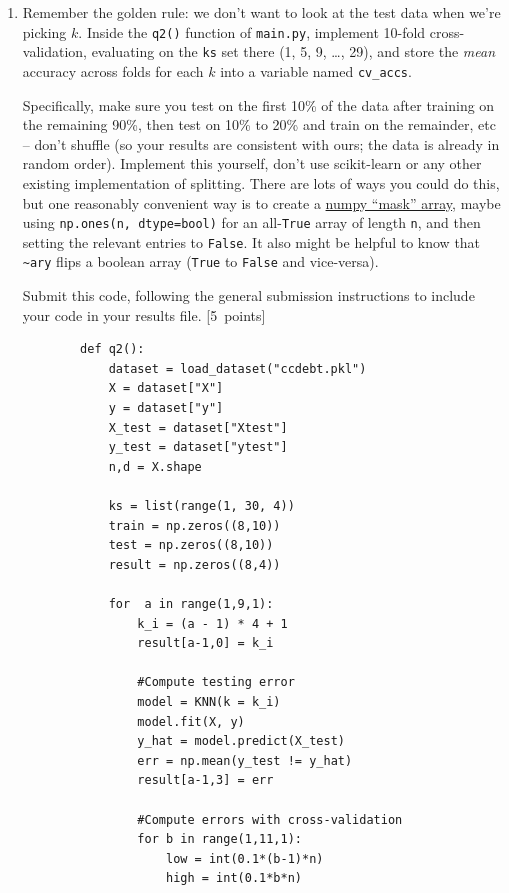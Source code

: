 \documentclass{article}
\newcommand{\blu}[1]{{\textcolor{blu}{#1}}}
\let\ask\blu
\newcommand\pts[1]{\textcolor{pointscolour}{[#1~points]}}
\begin{document}
    \begin{enumerate}
        \item Remember the golden rule: we don't want to look at the test data when we're picking $k$. Inside the \texttt{q2()} function of \texttt{main.py}, implement 10-fold cross-validation, evaluating on the \texttt{ks} set there (1, 5, 9, \dots, 29), and store the \emph{mean} accuracy across folds for each $k$ into a variable named \texttt{cv\_accs}.

        Specifically, make sure you test on the first 10\% of the data after training on the remaining 90\%, then test on 10\% to 20\% and train on the remainder, etc -- don't shuffle (so your results are consistent with ours; the data is already in random order). Implement this yourself, don't use scikit-learn or any other existing implementation of splitting. There are lots of ways you could do this, but one reasonably convenient way is to create a \href{https://numpy.org/doc/stable/user/basics.indexing.html#boolean-or-mask-index-arrays}{numpy ``mask'' array}, maybe using \texttt{np.ones(n, dtype=bool)} for an all-\texttt{True} array of length \texttt{n}, and then setting the relevant entries to \texttt{False}. It also might be helpful to know that \texttt{\textasciitilde ary} flips a boolean array (\texttt{True} to \texttt{False} and vice-versa).

        \ask{Submit this code}, following the general submission instructions to include your code in your results file. \pts{5}

        \begin{verbatim}
        def q2():
            dataset = load_dataset("ccdebt.pkl")
            X = dataset["X"]
            y = dataset["y"]
            X_test = dataset["Xtest"]
            y_test = dataset["ytest"]
            n,d = X.shape

            ks = list(range(1, 30, 4))
            train = np.zeros((8,10))
            test = np.zeros((8,10))
            result = np.zeros((8,4))

            for  a in range(1,9,1):
                k_i = (a - 1) * 4 + 1 
                result[a-1,0] = k_i
                
                #Compute testing error
                model = KNN(k = k_i)
                model.fit(X, y)
                y_hat = model.predict(X_test)
                err = np.mean(y_test != y_hat)
                result[a-1,3] = err

                #Compute errors with cross-validation
                for b in range(1,11,1):
                    low = int(0.1*(b-1)*n)
                    high = int(0.1*b*n)


\end{verbatim}
\end{enumerate}
\end{document}
